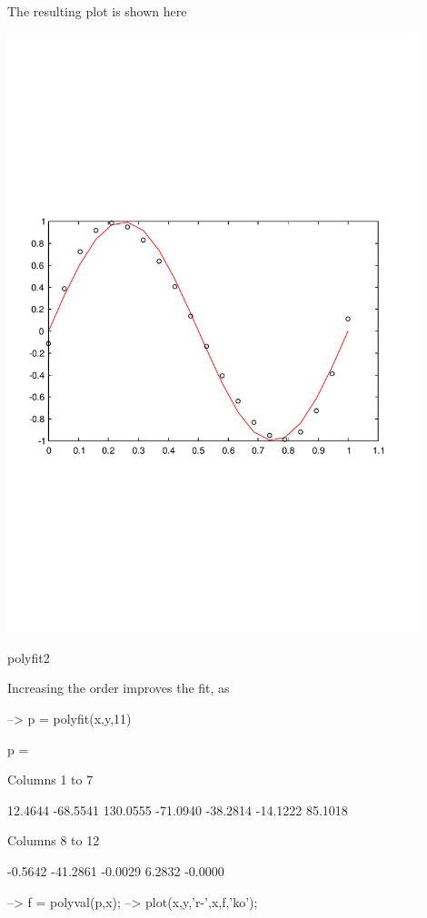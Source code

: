 The resulting plot is shown here  
\begin{DoxyImage}
\includegraphics[width=12cm]{polyfit2}
\caption{polyfit2}
\end{DoxyImage}
 Increasing the order improves the fit, as


\begin{DoxyVerbInclude}
--> p = polyfit(x,y,11)

p = 

 Columns 1 to 7

   12.4644  -68.5541  130.0555  -71.0940  -38.2814  -14.1222   85.1018 

 Columns 8 to 12

   -0.5642  -41.2861   -0.0029    6.2832   -0.0000 

--> f = polyval(p,x);
--> plot(x,y,'r-',x,f,'ko');
\end{DoxyVerbInclude}


